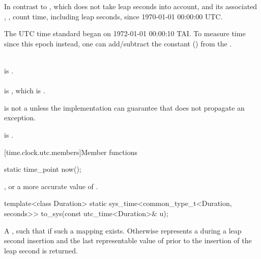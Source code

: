 \pnum
In contrast to ,
which does not take leap seconds into account,
 and its associated , ,
count time, including leap seconds, since 1970-01-01 00:00:00 UTC.
\begin{note}
The UTC time standard began on 1972-01-01 00:00:10 TAI.
To measure time since this epoch instead, one can add/subtract the constant
 ()
from the .
\end{note}
\begin{example}
\\
 is . \\
 \\
is , which is . \\
\end{example}

\pnum
{} is not a 
unless the implementation can guarantee that 
does not propagate an exception.
\begin{note}
 is .
\end{note}

[time.clock.utc.members]{Member functions}

%
\begin{itemdecl}
static time_point now();
\end{itemdecl}

\begin{itemdescr}
\pnum
\returns
{}, or a more accurate value of .
\end{itemdescr}

%
\begin{itemdecl}
template<class Duration>
  static sys_time<common_type_t<Duration, seconds>>
    to_sys(const utc_time<Duration>& u);
\end{itemdecl}

\begin{itemdescr}
\pnum
\returns
A  ,
such that  if such a mapping exists.
Otherwise  represents a 
during a leap second insertion
and the last representable value of 
prior to the insertion of the leap second is returned.
\end{itemdescr}

